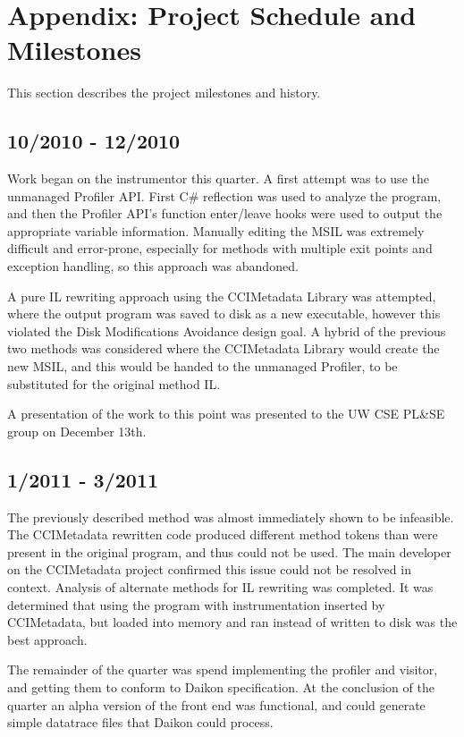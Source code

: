 \documentclass{article}
\begin{document}
\appendix

\section{Appendix: Project Schedule and Milestones}
This section describes the project milestones and history.

\subsection{10/2010 - 12/2010}
Work began on the instrumentor this quarter. A first attempt was to use the unmanaged Profiler API. First C\# reflection was used to analyze the program, and then the Profiler API's function enter/leave hooks were used to output the appropriate variable information. Manually editing the MSIL was extremely difficult and error-prone, especially for methods with multiple exit points and exception handling, so this approach was abandoned.

A pure IL rewriting approach using the CCIMetadata Library was attempted, where the output program was saved to disk as a new executable, however this violated the Disk Modifications Avoidance design goal. A hybrid of the previous two methods was considered where the CCIMetadata Library would create the new MSIL, and this would be handed to the unmanaged Profiler, to be substituted for the original method IL.

A presentation of the work to this point was presented to the UW CSE PL\&SE group on December 13th.
\subsection{1/2011 - 3/2011}
The previously described method was almost immediately shown to be infeasible. The CCIMetadata rewritten code produced different method tokens than were present in the original program, and thus could not be used. The main developer on the CCIMetadata project confirmed this issue could not be resolved in context. Analysis of alternate methods for IL rewriting was completed. It was determined that using the program with instrumentation inserted by CCIMetadata, but loaded into memory and ran instead of written to disk was the best approach.

The remainder of the quarter was spend implementing the profiler and visitor, and getting them to conform to Daikon specification. At the conclusion of the quarter an alpha version of the front end was functional, and could generate simple datatrace files that Daikon could process.
\end{document}
